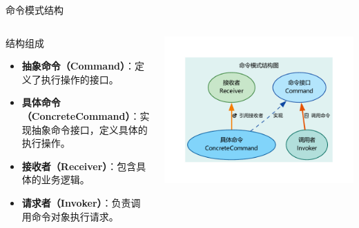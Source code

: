 \documentclass[UTF8,aspectratio=169]{beamer}
\begin{document}
\begin{frame}{命令模式结构}
    \begin{columns}
        \begin{column}{0.38\textwidth}
            \begin{ytublock}{结构组成}
                \begin{itemize}
                    \item \textbf{抽象命令（Command）}：定义了执行操作的接口。
                    \item \textbf{具体命令（ConcreteCommand）}：实现抽象命令接口，定义具体的执行操作。
                    \item \textbf{接收者（Receiver）}：包含具体的业务逻辑。
                    \item \textbf{请求者（Invoker）}：负责调用命令对象执行请求。
                \end{itemize}
            \end{ytublock}
        \end{column}
        \begin{column}{0.58\textwidth}
            \begin{center}
                \includegraphics[width=1.0\textwidth]{images/command_pattern.pdf}
            \end{center}
        \end{column}
    \end{columns}
\end{frame}
\end{document}
